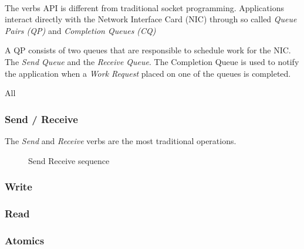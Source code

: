 \paragraph{}The verbs API is different from traditional socket programming. Applications interact directly with the Network 
Interface Card (NIC) through so called \emph{Queue Pairs (QP)} and \emph{Completion Queues (CQ)}

A QP consists of two queues that are responsible to schedule work for the NIC. The \emph{Send Queue} and the \emph{Receive 
Queue}. The Completion Queue is used to notify the application when a \emph{Work Request} placed on one of the queues is 
completed.

All




\subsubsection{Send / Receive}
The \emph{Send} and \emph{Receive} verbs are the most traditional operations.



\begin{figure}[!ht]
\begin{center}
\end{center}
\caption{Send Receive sequence}
\label{fig:seq-sndrcv}
\end{figure}





\subsubsection{Write}
\subsubsection{Read}
\subsubsection{Atomics}

